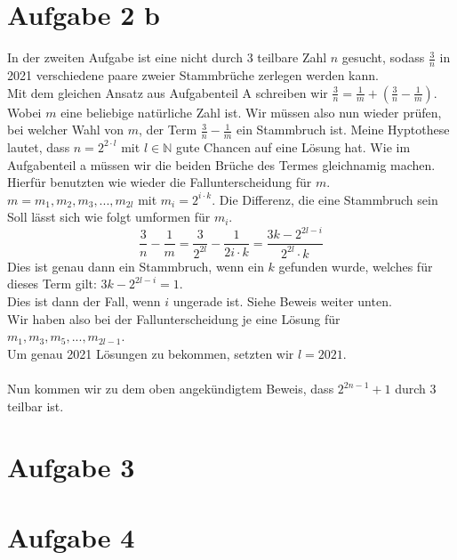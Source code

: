 \documentclass{article}
\begin{document}
\section*{Aufgabe 2 b}
In der zweiten Aufgabe ist eine nicht durch 3 teilbare Zahl \(n\) gesucht, 
sodass \(\frac{3}{n}\) in 2021 verschiedene paare zweier Stammbrüche zerlegen werden kann.\\
Mit dem gleichen Ansatz aus Aufgabenteil A schreiben wir \(\frac{3}{n} = \frac{1}{m} + (\frac{3}{n} - \frac{1}{m})\). 
Wobei \(m\) eine beliebige natürliche Zahl ist. Wir müssen also nun wieder prüfen, bei welcher Wahl von \(m\), 
der Term \(\frac{3}{n} - \frac{1}{m}\) ein Stammbruch ist. Meine Hyptothese lautet, dass \(n = 2^{2 \cdot l}\) mit \(l \in \mathbb{N}\) 
gute Chancen auf eine Lösung hat. Wie im Aufgabenteil a müssen wir die beiden Brüche des Termes gleichnamig machen.\\
Hierfür benutzten wie wieder die Fallunterscheidung für $m$.\\
\(m = m_1, m_2, m_3, ..., m_{2l}\) mit \(m_i = 2^{i \cdot k}\). 
Die Differenz, die eine Stammbruch sein Soll lässt sich wie folgt umformen für $m_i$. 
\begin{equation}
    \frac{3}{n} - \frac{1}{m} = \frac{3}{2^{2l}} - \frac{1}{2i \cdot k} = \frac{3k - 2^{2l - i}}{2^{2l} \cdot k}
\end{equation}
Dies ist genau dann ein Stammbruch, wenn ein $k$ gefunden wurde, welches für dieses Term gilt: $3k - 2^{2l - i} = 1$.\\
Dies ist dann der Fall, wenn $i$ ungerade ist. Siehe Beweis weiter unten.\\
Wir haben also bei der Fallunterscheidung je eine Lösung für \(m_1, m_3, m_5, ..., m_{2l - 1}\).\\
Um genau 2021 Lösungen zu bekommen, setzten wir  $l = 2021$.\\\\
Nun kommen wir zu dem oben angekündigtem Beweis, dass \(2^{2n - 1} + 1\) durch 3 teilbar ist.
\section*{Aufgabe 3}
\section*{Aufgabe 4}
\end{document}
